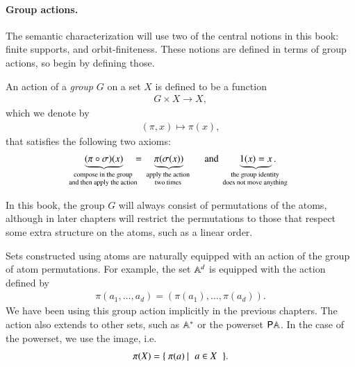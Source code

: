 \paragraph*{Group actions.}
The semantic characterization will use two of the central notions in this book: finite supports, and orbit-finiteness. These notions are defined in terms of group actions, so begin by defining those. 





\begin{definition}\label{def:group-action}
    An action of a \emph{group} $G$ on a set $X$ is defined to be a function 
    \begin{align*}
     G \times X \to X,
    \end{align*}
    which we denote by
    \begin{align*}
    (\pi,x) \mapsto \pi(x),
    \end{align*}
    that satisfies the following two axioms: 
    \begin{align*}
    \myunderbrace{(\pi \circ \sigma)(x)}{compose in the group\\ and then apply the action} \quad = \quad \myunderbrace{\pi(\sigma(x))}{apply the action \\ two times} 
    \qquad \text{and} \qquad 
    \myunderbrace{1(x)=x}{the group identity\\ does not move anything}.
    \end{align*}
\end{definition}

In this book, the group $G$ will always consist of  permutations of the atoms, although in later chapters will restrict the permutations to those that respect some extra structure on the atoms, such as a linear order.

\begin{myexample}
    Sets constructed using atoms are naturally equipped with an action  of the group of atom permutations. For example, the set $\mathbb A^d$ is equipped with the action defined by 
    \begin{align*}
    \pi(a_1,\ldots,a_d) = (\pi(a_1),\ldots,\pi(a_d)).
    \end{align*}
    We have been using this group action implicitly in the previous chapters. The action also extends to other sets, such as $\mathbb A^*$ or the powerset ${\mathsf P} \mathbb A$. In the case of the powerset, we use the image, i.e.~\begin{align*}
    \pi(X) = \setbuild{\pi(a)}{$a \in X$}.
    \end{align*}
\end{myexample}

